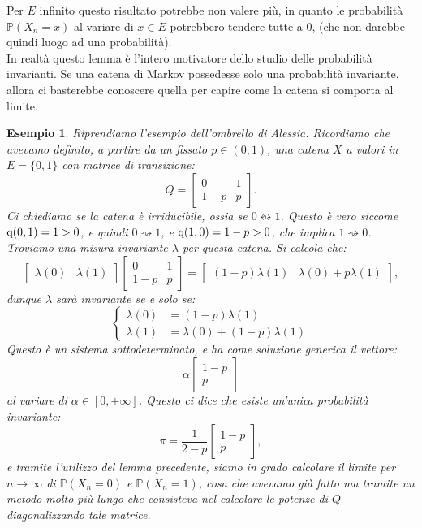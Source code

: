 \documentclass[11pt]{book}
\theoremstyle{Definizione}
\theoremstyle{TeoremaProposizioneLemmaCorollario}
\theoremstyle{OsservazioneNota}
\newtheorem{myes}{Esempio}[section]
\renewcommand{\P}{\mathbb{P}}
\newcommand{\conduce}{\rightsquigarrow}
\newcommand{\comunica}{\leftrightsquigarrow}
\newcommand{\q}{\textup{q}}
\begin{document}
\noindent
Per $E$ infinito questo risultato potrebbe non valere più, in quanto le probabilità $\P(X_n = x)$ al variare di $x\in E$ potrebbero tendere tutte a $0$, (che non darebbe quindi luogo ad una probabilità).\\
In realtà questo lemma è l'intero motivatore dello studio delle probabilità invarianti. Se una catena di Markov possedesse solo una probabilità invariante, allora ci basterebbe conoscere quella per capire come la catena si comporta al limite.
\begin{myes}
Riprendiamo l'esempio dell'ombrello di Alessia. Ricordiamo che avevamo definito, a partire da un fissato $p\in (0,1)$, una catena $X$ a valori in $E = \{0,1\}$ con matrice di transizione:
$$
Q = \begin{bmatrix}
0 & 1 \\ 1-p & p
\end{bmatrix}.
$$
Ci chiediamo se la catena è irriducibile, ossia se $0 \comunica 1$. Questo è vero siccome $\q(0,1) = 1 > 0$, e quindi $0 \conduce 1$, e $\q(1,0) = 1-p > 0$, che implica $1 \conduce 0$. Troviamo una misura invariante $\lambda$ per questa catena. Si calcola che:
$$
\begin{bmatrix}
\lambda(0) & \lambda(1)
\end{bmatrix}\begin{bmatrix}
0 & 1 \\ 1-p & p
\end{bmatrix} = \begin{bmatrix}
(1-p)\lambda(1) & \lambda(0)+p\lambda(1)
\end{bmatrix},
$$
dunque $\lambda$ sarà invariante se e solo se:
$$
\begin{cases}
\lambda(0) &= (1-p) \lambda(1)\\
\lambda(1) &= \lambda(0)+(1-p)\lambda(1)
\end{cases}
$$
Questo è un sistema sottodeterminato, e ha come soluzione generica il vettore:
$$
\alpha\begin{bmatrix}
1-p \\ p
\end{bmatrix}
$$
al variare di $\alpha\in [0,+\infty]$. Questo ci dice che esiste un'unica probabilità invariante:
$$
\pi = \frac{1}{2-p}\begin{bmatrix}
1-p \\ p
\end{bmatrix},
$$
e tramite l'utilizzo del lemma precedente, siamo in grado calcolare il limite per $n \to \infty$ di $\P(X_n = 0)$ e $\P(X_n = 1)$, cosa che avevamo già fatto ma tramite un metodo molto più lungo che consisteva nel calcolare le potenze di $Q$ diagonalizzando tale matrice.
\end{myes}
\end{document}
